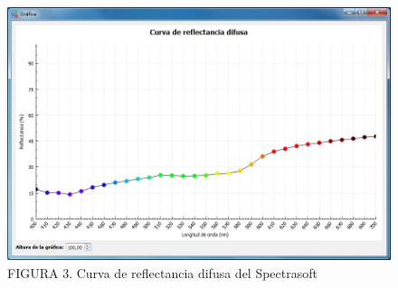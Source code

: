 \documentclass[conference]{IEEEtran}
\begin{document}
\FloatBarrier

\begin{figure}[h]
  \includegraphics[scale=.375]{./img/curva-reflectancia.jpg}
  \caption{FIGURA 3. Curva de reflectancia difusa del Spectrasoft}
\end{figure}
	
\end{document}
